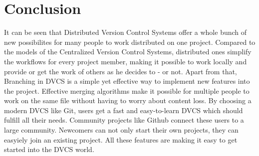 \section{Conclusion}\label{conclusion}

It can be seen that Distributed Version Control Systems offer a whole bunch of new possibilites for many people to work distributed on one project. Compared to the models of the Centralized Version Control Systems, distributed ones simplify the workflows for every project member, making it possible to work locally and provide or get the work of others as he decides to - or not. Apart from that, Branching in DVCS is a simple yet effective way to implement new features into the project. Effective merging algorithms make it possible for multiple people to work on the same file without having to worry about content loss. \newline
By choosing a modern DVCS like Git, users get a fast and easy-to-learn DVCS which should fulfill all their needs. Community projects like Github connect these users to a large community. Newcomers can not only start their own projects, they can easyiely join an existing project. All these features are making it easy to get started into the DVCS world.